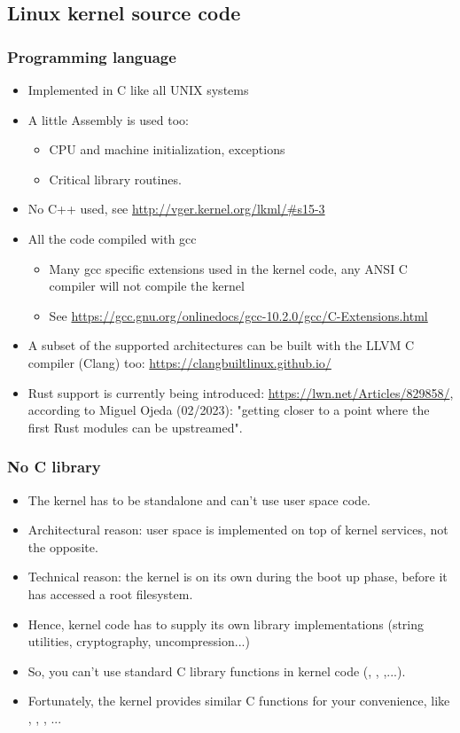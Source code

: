 \subsection{Linux kernel source code}

\begin{frame}
  \frametitle{Programming language}
  \begin{itemize}
  \item Implemented in C like all UNIX systems
  \item A little Assembly is used too:
    \begin{itemize}
    \item CPU and machine initialization, exceptions
    \item Critical library routines.
    \end{itemize}
  \item No C++ used, see \url{http://vger.kernel.org/lkml/\#s15-3}
  \item All the code compiled with gcc
    \begin{itemize}
    \item Many gcc specific extensions used in the kernel code, any
      ANSI C compiler will not compile the kernel
    \item See
      \url{https://gcc.gnu.org/onlinedocs/gcc-10.2.0/gcc/C-Extensions.html}
    \end{itemize}
    \item A subset of the supported architectures can be built with the
      LLVM C compiler (Clang) too: \url{https://clangbuiltlinux.github.io/}
    \item Rust support is currently being introduced:
      \url{https://lwn.net/Articles/829858/}, according to Miguel Ojeda
      (02/2023): "getting closer to a point where the first Rust modules
      can be upstreamed".
  \end{itemize}
\end{frame}

\begin{frame}
  \frametitle{No C library}
  \begin{itemize}
  \item The kernel has to be standalone and can't use user space code.
  \item Architectural reason: user space is implemented on top of kernel services, not the
    opposite.
  \item Technical reason: the kernel is on its own during the boot up
    phase, before it has accessed a root filesystem.
  \item Hence, kernel code has to supply its own library implementations
    (string utilities, cryptography, uncompression...)
  \item So, you can't use standard C library functions in kernel code
    (, , ,...).
  \item Fortunately, the kernel provides similar C functions for your
    convenience, like , ,
    , ...
  \end{itemize}
\end{frame}

